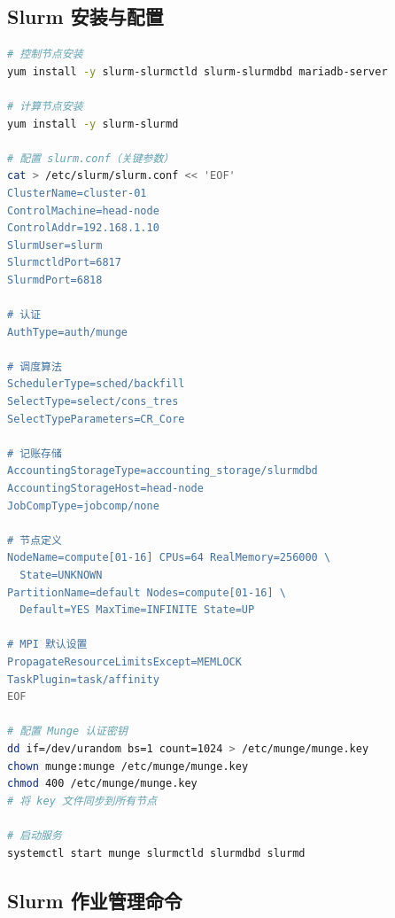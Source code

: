 \documentclass[12pt,UTF8]{ctexbook}
\begin{document}
\subsection{Slurm 安装与配置}

\begin{lstlisting}[language=bash]
# 控制节点安装
yum install -y slurm-slurmctld slurm-slurmdbd mariadb-server

# 计算节点安装
yum install -y slurm-slurmd

# 配置 slurm.conf（关键参数）
cat > /etc/slurm/slurm.conf << 'EOF'
ClusterName=cluster-01
ControlMachine=head-node
ControlAddr=192.168.1.10
SlurmUser=slurm
SlurmctldPort=6817
SlurmdPort=6818

# 认证
AuthType=auth/munge

# 调度算法
SchedulerType=sched/backfill
SelectType=select/cons_tres
SelectTypeParameters=CR_Core

# 记账存储
AccountingStorageType=accounting_storage/slurmdbd
AccountingStorageHost=head-node
JobCompType=jobcomp/none

# 节点定义
NodeName=compute[01-16] CPUs=64 RealMemory=256000 \
  State=UNKNOWN
PartitionName=default Nodes=compute[01-16] \
  Default=YES MaxTime=INFINITE State=UP

# MPI 默认设置
PropagateResourceLimitsExcept=MEMLOCK
TaskPlugin=task/affinity
EOF

# 配置 Munge 认证密钥
dd if=/dev/urandom bs=1 count=1024 > /etc/munge/munge.key
chown munge:munge /etc/munge/munge.key
chmod 400 /etc/munge/munge.key
# 将 key 文件同步到所有节点

# 启动服务
systemctl start munge slurmctld slurmdbd slurmd
\end{lstlisting}

\subsection{Slurm 作业管理命令}
\end{document}
